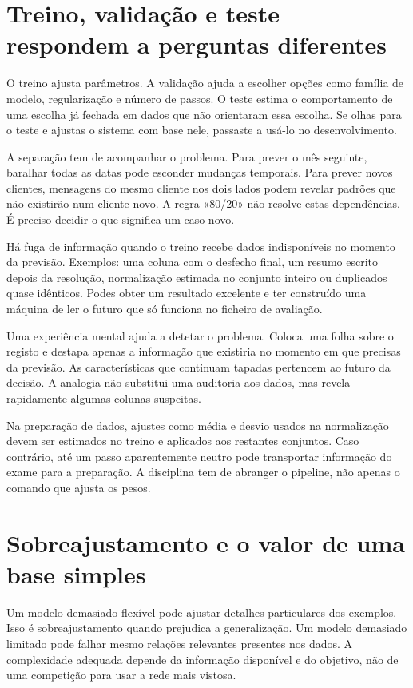 \section{Treino, validação e teste respondem a perguntas diferentes}
O treino ajusta parâmetros. A validação ajuda a escolher opções como família de modelo, regularização e número de passos. O teste estima o comportamento de uma escolha já fechada em dados que não orientaram essa escolha. Se olhas para o teste e ajustas o sistema com base nele, passaste a usá-lo no desenvolvimento.

A separação tem de acompanhar o problema. Para prever o mês seguinte, baralhar todas as datas pode esconder mudanças temporais. Para prever novos clientes, mensagens do mesmo cliente nos dois lados podem revelar padrões que não existirão num cliente novo. A regra «80/20» não resolve estas dependências. É preciso decidir o que significa um caso novo.

Há fuga de informação quando o treino recebe dados indisponíveis no momento da previsão. Exemplos: uma coluna com o desfecho final, um resumo escrito depois da resolução, normalização estimada no conjunto inteiro ou duplicados quase idênticos. Podes obter um resultado excelente e ter construído uma máquina de ler o futuro que só funciona no ficheiro de avaliação.

Uma experiência mental ajuda a detetar o problema. Coloca uma folha sobre o registo e destapa apenas a informação que existiria no momento em que precisas da previsão. As características que continuam tapadas pertencem ao futuro da decisão. A analogia não substitui uma auditoria aos dados, mas revela rapidamente algumas colunas suspeitas.

Na preparação de dados, ajustes como média e desvio usados na normalização devem ser estimados no treino e aplicados aos restantes conjuntos. Caso contrário, até um passo aparentemente neutro pode transportar informação do exame para a preparação. A disciplina tem de abranger o pipeline, não apenas o comando que ajusta os pesos.

\section{Sobreajustamento e o valor de uma base simples}
Um modelo demasiado flexível pode ajustar detalhes particulares dos exemplos. Isso é sobreajustamento quando prejudica a generalização. Um modelo demasiado limitado pode falhar mesmo relações relevantes presentes nos dados. A complexidade adequada depende da informação disponível e do objetivo, não de uma competição para usar a rede mais vistosa.

